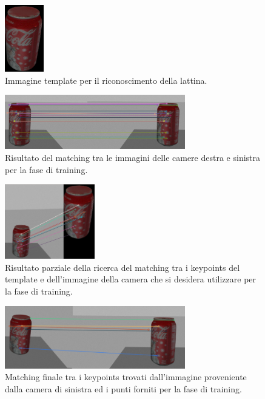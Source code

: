 \documentclass[english]{article}
\begin{document}
\begin{figure}[!h]
\centering
\includegraphics[width=0.15\textwidth]{template_lattina}
\caption{Immagine template per il riconoscimento della lattina.}
\label{fig:template}
\end{figure}

\begin{figure}[!h]
\centering
\includegraphics[width=0.7\textwidth]{train}
\caption{Risultato del matching tra le immagini delle camere destra e sinistra per la fase di training.}
\label{fig:train}
\end{figure}

\begin{figure}[!h]
\centering
\includegraphics[width=0.35\textwidth]{template}
\caption{Risultato parziale della ricerca del matching tra i keypoints del template e dell'immagine della camera che si desidera utilizzare per la fase di training.}
\label{fig:query_template}
\end{figure}

\begin{figure}[!h]
\centering
\includegraphics[width=0.7\textwidth]{query}
\caption{Matching finale tra i keypoints trovati dall'immagine proveniente dalla camera di sinistra ed i punti forniti per la fase di training.}
\label{fig:query_camera}
\end{figure}
\end{document}
